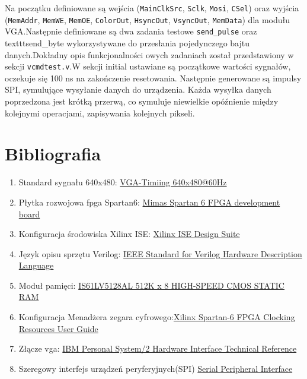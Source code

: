 \documentclass[12pt, a4paper]{article}
\begin{document}
Na początku definiowane są wejścia (\texttt{MainClkSrc}, \texttt{Sclk}, \texttt{Mosi}, \texttt{CSel}) oraz wyjścia (\texttt{MemAddr}, \texttt{MemWE}, \texttt{MemOE}, \texttt{ColorOut}, \texttt{HsyncOut}, \texttt{VsyncOut}, \texttt{MemData}) dla modułu VGA.Następnie definiowane są dwa zadania testowe
\texttt{send_pulse} oraz texttt{send_byte} wykorzystywane do przesłania pojedynczego bajtu danych.Dokładny opis funkcjonalności owych zadaniach został przedstawiony w sekcji \texttt{vcmdtest.v}.W sekcji initial ustawiane są początkowe wartości sygnałów, oczekuje się 100 ns na zakończenie resetowania. Następnie generowane są impulsy SPI, symulujące wysyłanie danych do urządzenia. Każda wysyłka danych poprzedzona jest krótką przerwą, co symuluje niewielkie opóźnienie między kolejnymi operacjami, zapisywania kolejnych pikseli.

\newpage
\section{Bibliografia}
\begin{enumerate}[label={\textbullet}]
    \item Standard sygnału 640x480: \href{https://tinyvga.com/vga-timing/640x480@60Hz}{VGA-Timiing 640x480@60Hz}
    \item Płytka rozwojowa fpga Spartan6: \href{https://numato.com/docs/mimas-spartan-6-fpga-development-board/}{Mimas Spartan 6 FPGA development board}
     \item Konfiguracja środowiska Xilinx ISE: \href{https://www.xilinx.com/products/design-tools/ise-design-suite.html}{Xilinx ISE Design Suite}
     \item Język opisu sprzętu Verilog: \href{https://www.eg.bucknell.edu/~csci320/2016-fall/wp-content/uploads/2015/08/verilog-std-1364-2005.pdf}{IEEE Standard for Verilog
    Hardware Description Language}
    \item Moduł pamięci: \href{https://www.mouser.pl/datasheet/2/198/61LV5128AL-258297.pdf}{
    IS61LV5128AL 512K x 8 HIGH-SPEED CMOS STATIC RAM}
    \item Konfiguracja Menadżera zegara cyfrowego:\href{https://0x04.net/~mwk/xidocs/ug/ug382.pdf}{Xilinx Spartan-6 FPGA Clocking Resources User Guide}
    \item Złącze vga: \href{https://web.archive.org/web/20180514201314/http://classiccomputers.info/down/IBM_PS2/documents/PS2_Hardware_Interface_Technical_Reference_May88.pdf#page=492}{IBM Personal System/2 Hardware Interface Technical Reference}
    \item Szeregowy interfejs urządzeń peryferyjnych(SPI) \href{https://en.wikipedia.org/wiki/Serial_Peripheral_Interface}{Serial Peripheral Interface}
\end{enumerate}
\end{document}
